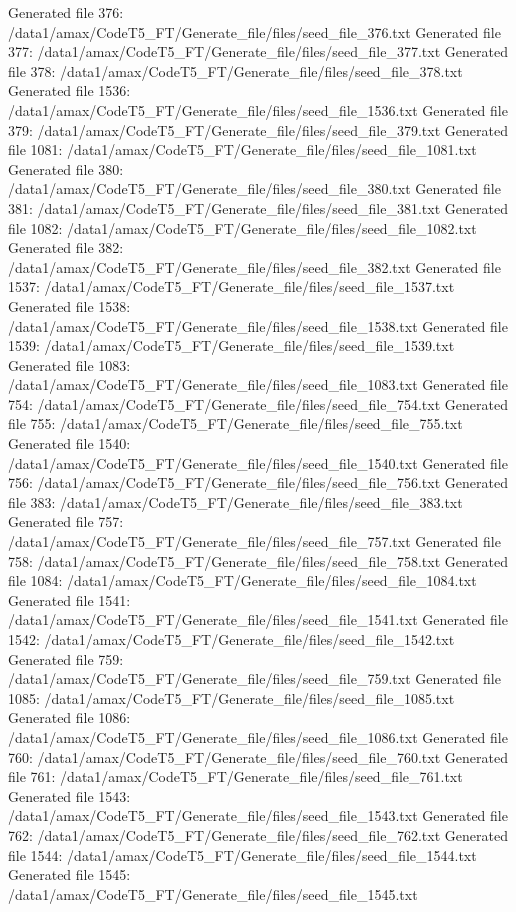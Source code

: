 Generated file 376: /data1/amax/CodeT5_FT/Generate_file/files/seed_file_376.txt
Generated file 377: /data1/amax/CodeT5_FT/Generate_file/files/seed_file_377.txt
Generated file 378: /data1/amax/CodeT5_FT/Generate_file/files/seed_file_378.txt
Generated file 1536: /data1/amax/CodeT5_FT/Generate_file/files/seed_file_1536.txt
Generated file 379: /data1/amax/CodeT5_FT/Generate_file/files/seed_file_379.txt
Generated file 1081: /data1/amax/CodeT5_FT/Generate_file/files/seed_file_1081.txt
Generated file 380: /data1/amax/CodeT5_FT/Generate_file/files/seed_file_380.txt
Generated file 381: /data1/amax/CodeT5_FT/Generate_file/files/seed_file_381.txt
Generated file 1082: /data1/amax/CodeT5_FT/Generate_file/files/seed_file_1082.txt
Generated file 382: /data1/amax/CodeT5_FT/Generate_file/files/seed_file_382.txt
Generated file 1537: /data1/amax/CodeT5_FT/Generate_file/files/seed_file_1537.txt
Generated file 1538: /data1/amax/CodeT5_FT/Generate_file/files/seed_file_1538.txt
Generated file 1539: /data1/amax/CodeT5_FT/Generate_file/files/seed_file_1539.txt
Generated file 1083: /data1/amax/CodeT5_FT/Generate_file/files/seed_file_1083.txt
Generated file 754: /data1/amax/CodeT5_FT/Generate_file/files/seed_file_754.txt
Generated file 755: /data1/amax/CodeT5_FT/Generate_file/files/seed_file_755.txt
Generated file 1540: /data1/amax/CodeT5_FT/Generate_file/files/seed_file_1540.txt
Generated file 756: /data1/amax/CodeT5_FT/Generate_file/files/seed_file_756.txt
Generated file 383: /data1/amax/CodeT5_FT/Generate_file/files/seed_file_383.txt
Generated file 757: /data1/amax/CodeT5_FT/Generate_file/files/seed_file_757.txt
Generated file 758: /data1/amax/CodeT5_FT/Generate_file/files/seed_file_758.txt
Generated file 1084: /data1/amax/CodeT5_FT/Generate_file/files/seed_file_1084.txt
Generated file 1541: /data1/amax/CodeT5_FT/Generate_file/files/seed_file_1541.txt
Generated file 1542: /data1/amax/CodeT5_FT/Generate_file/files/seed_file_1542.txt
Generated file 759: /data1/amax/CodeT5_FT/Generate_file/files/seed_file_759.txt
Generated file 1085: /data1/amax/CodeT5_FT/Generate_file/files/seed_file_1085.txt
Generated file 1086: /data1/amax/CodeT5_FT/Generate_file/files/seed_file_1086.txt
Generated file 760: /data1/amax/CodeT5_FT/Generate_file/files/seed_file_760.txt
Generated file 761: /data1/amax/CodeT5_FT/Generate_file/files/seed_file_761.txt
Generated file 1543: /data1/amax/CodeT5_FT/Generate_file/files/seed_file_1543.txt
Generated file 762: /data1/amax/CodeT5_FT/Generate_file/files/seed_file_762.txt
Generated file 1544: /data1/amax/CodeT5_FT/Generate_file/files/seed_file_1544.txt
Generated file 1545: /data1/amax/CodeT5_FT/Generate_file/files/seed_file_1545.txt
